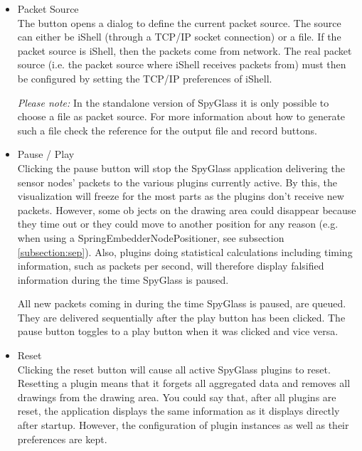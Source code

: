 		\begin{itemize}
			
			\item Packet Source\\
				The button opens a dialog to define the current packet source. The source 
				can either be iShell (through a TCP/IP socket connection) or a file. If 
				the packet source is iShell, then the packets come from network. The real 
				packet source (i.e. the packet source where iShell receives packets from)
				must then be configured by setting the TCP/IP preferences of iShell.
				
				\emph{Please note:} In the standalone version of SpyGlass it is only possible to 
				choose a file as packet source. For more information about how to generate 
				such a file check the reference for the output file and record buttons.
			
			\item Pause / Play\\
				Clicking the pause button will stop the SpyGlass application delivering 
				the sensor nodes’ packets to the various plugins currently active. By this, 
				the visualization will freeze for the most parts as the plugins don’t receive 
				new packets. However, some ob jects on the drawing area could disappear 
				because they time out or they could move to another position for any 
				reason (e.g. when using a SpringEmbedderNodePositioner, see subsection 
				\ref{subsection:sep}). Also, plugins doing statistical calculations including
				timing information, such as packets per second, will therefore display falsified
				information during the time SpyGlass is paused.
				
				All new packets coming in during the time SpyGlass is paused, are queued. 
				They are delivered sequentially after the play button has been clicked. The 
				pause button toggles to a play button when it was clicked and vice versa.
				
			\item Reset\\
				Clicking the reset button will cause all active SpyGlass plugins to reset.
				Resetting a plugin means that it forgets all aggregated data and removes
				all drawings from the drawing area. You could say that, after all plugins
				are reset, the application displays the same information as it displays
				directly after startup. However, the configuration of plugin instances as
				well as their preferences are kept.
				

\end{itemize}
